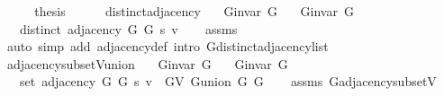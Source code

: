\begin{isabellebody}
\ \ \isamarkupfalse%
\ \isamarkupfalse%
\ {\isacharquery}{\kern0pt}thesis\isanewline
\ \ \ \ \isacommand{{\isachardot}{\kern0pt}{\isachardot}{\kern0pt}}\isamarkupfalse%
\isanewline
{}\isamarkupfalse%
%
\endisatagproof
{\isafoldproof}%
%
\isadelimproof
%
\endisadelimproof
%
\isadelimdocument
%
\endisadelimdocument
%
\isatagdocument
%
\isamarkuptrue%
%
\endisatagdocument
{\isafolddocument}%
%
\isadelimdocument
%
\endisadelimdocument
{}\isamarkupfalse%
\ distinct{\isacharunderscore}{\kern0pt}adjacency{\isacharcolon}{\kern0pt}\isanewline
\ \ \ {\isachardoublequoteopen}G{\isachardot}{\kern0pt}invar\ G{}{\isachardoublequoteclose}\isanewline
\ \ \ {\isachardoublequoteopen}G{\isachardot}{\kern0pt}invar\ G{}{\isachardoublequoteclose}\isanewline
\ \ \ {\isachardoublequoteopen}distinct\ {\isacharparenleft}{\kern0pt}adjacency\ G{}\ G{}\ s\ v{\isacharparenright}{\kern0pt}{\isachardoublequoteclose}\isanewline
%
\isadelimproof
\ \ %
\endisadelimproof
%
\isatagproof
{}\isamarkupfalse%
\ assms\isanewline
\ \ \isamarkupfalse%
\ {\isacharparenleft}{\kern0pt}auto\ simp\ add{\isacharcolon}{\kern0pt}\ adjacency{\isacharunderscore}{\kern0pt}def\ intro{\isacharcolon}{\kern0pt}\ G{\isachardot}{\kern0pt}distinct{\isacharunderscore}{\kern0pt}adjacency{\isacharunderscore}{\kern0pt}list{\isacharparenright}{\kern0pt}%
\endisatagproof
{\isafoldproof}%
%
\isadelimproof
\isanewline
%
\endisadelimproof
\isanewline
{}\isamarkupfalse%
\ adjacency{\isacharunderscore}{\kern0pt}subset{\isacharunderscore}{\kern0pt}V{\isacharunderscore}{\kern0pt}union{\isacharcolon}{\kern0pt}\isanewline
\ \ \ {\isachardoublequoteopen}G{\isachardot}{\kern0pt}invar\ G{}{\isachardoublequoteclose}\isanewline
\ \ \ {\isachardoublequoteopen}G{\isachardot}{\kern0pt}invar\ G{}{\isachardoublequoteclose}\isanewline
\ \ \ {\isachardoublequoteopen}set\ {\isacharparenleft}{\kern0pt}adjacency\ G{}\ G{}\ s\ v{\isacharparenright}{\kern0pt}\ {\isasymsubseteq}\ G{\isachardot}{\kern0pt}V\ {\isacharparenleft}{\kern0pt}G{\isachardot}{\kern0pt}union\ G{}\ G{}{\isacharparenright}{\kern0pt}{\isachardoublequoteclose}\isanewline
%
\isadelimproof
\ \ %
\endisadelimproof
%
\isatagproof
{}\isamarkupfalse%
\ assms\ G{\isachardot}{\kern0pt}adjacency{\isacharunderscore}{\kern0pt}subset{\isacharunderscore}{\kern0pt}V\isanewline

\end{isabellebody}
